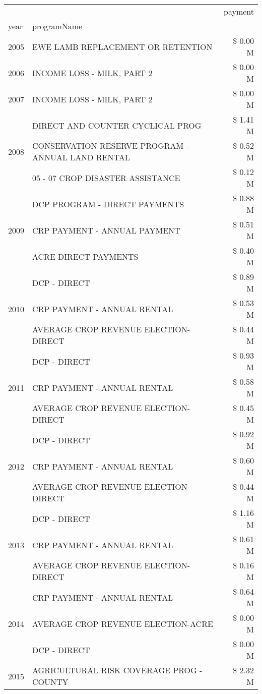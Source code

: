 \begin{tabular}{llr}
\toprule
 &  & payment \\
year & programName &  \\
\midrule
2005 & EWE LAMB REPLACEMENT OR RETENTION & \$ 0.00 M \\
\cline{1-3}
2006 & INCOME LOSS - MILK, PART 2 & \$ 0.00 M \\
\cline{1-3}
2007 & INCOME LOSS - MILK, PART 2 & \$ 0.00 M \\
\cline{1-3}
\multirow[t]{3}{*}{2008} & DIRECT AND COUNTER CYCLICAL PROG & \$ 1.41 M \\
 & CONSERVATION RESERVE PROGRAM - ANNUAL LAND RENTAL & \$ 0.52 M \\
 & 05 - 07 CROP DISASTER ASSISTANCE & \$ 0.12 M \\
\cline{1-3}
\multirow[t]{3}{*}{2009} & DCP PROGRAM - DIRECT PAYMENTS & \$ 0.88 M \\
 & CRP PAYMENT - ANNUAL PAYMENT & \$ 0.51 M \\
 & ACRE DIRECT PAYMENTS & \$ 0.40 M \\
\cline{1-3}
\multirow[t]{3}{*}{2010} & DCP - DIRECT & \$ 0.89 M \\
 & CRP PAYMENT - ANNUAL RENTAL & \$ 0.53 M \\
 & AVERAGE CROP REVENUE ELECTION-DIRECT & \$ 0.44 M \\
\cline{1-3}
\multirow[t]{3}{*}{2011} & DCP - DIRECT & \$ 0.93 M \\
 & CRP PAYMENT - ANNUAL RENTAL & \$ 0.58 M \\
 & AVERAGE CROP REVENUE ELECTION-DIRECT & \$ 0.45 M \\
\cline{1-3}
\multirow[t]{3}{*}{2012} & DCP - DIRECT & \$ 0.92 M \\
 & CRP PAYMENT - ANNUAL RENTAL & \$ 0.60 M \\
 & AVERAGE CROP REVENUE ELECTION-DIRECT & \$ 0.44 M \\
\cline{1-3}
\multirow[t]{3}{*}{2013} & DCP - DIRECT & \$ 1.16 M \\
 & CRP PAYMENT - ANNUAL RENTAL & \$ 0.61 M \\
 & AVERAGE CROP REVENUE ELECTION-DIRECT & \$ 0.16 M \\
\cline{1-3}
\multirow[t]{3}{*}{2014} & CRP PAYMENT - ANNUAL RENTAL & \$ 0.64 M \\
 & AVERAGE CROP REVENUE ELECTION-ACRE & \$ 0.00 M \\
 & DCP - DIRECT & \$ 0.00 M \\
\cline{1-3}
\multirow[t]{3}{*}{2015} & AGRICULTURAL RISK COVERAGE PROG - COUNTY & \$ 2.32 M \\

\end{tabular}
